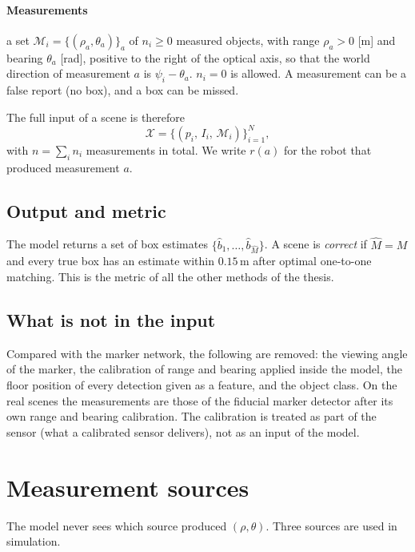 \documentclass[conference]{IEEEtran}
\begin{document}
\paragraph{Measurements} a set $\mathcal{M}_i=\{(\rho_a,\theta_a)\}_{a}$ of $n_i\ge0$ measured objects, with range
$\rho_a>0$ [m] and bearing $\theta_a$ [rad], positive to the right of the optical axis, so that the world direction
of measurement $a$ is $\psi_i-\theta_a$. $n_i=0$ is allowed. A measurement can be a false report (no box), and a box
can be missed.

The full input of a scene is therefore
\begin{equation}
\mathcal{X}=\bigl\{(p_i,\,I_i,\,\mathcal{M}_i)\bigr\}_{i=1}^{N},
\end{equation}
with $n=\sum_i n_i$ measurements in total. We write $r(a)$ for the robot that produced measurement $a$.

\subsection{Output and metric}
The model returns a set of box estimates $\{\hat b_1,\dots,\hat b_{\hat M}\}$. A scene is \emph{correct} if
$\hat M=M$ and every true box has an estimate within $0.15$\,m after optimal one-to-one matching. This is the metric
of all the other methods of the thesis.

\subsection{What is not in the input}
Compared with the marker network, the following are removed: the viewing angle of the marker, the calibration of
range and bearing applied inside the model, the floor position of every detection given as a feature, and the
object class. On the real scenes the measurements are those of the fiducial marker detector after its own range and
bearing calibration. The calibration is treated as part of the sensor (what a calibrated sensor delivers), not as an
input of the model.

\section{Measurement sources}

The model never sees which source produced $(\rho,\theta)$. Three sources are used in simulation.
\end{document}
